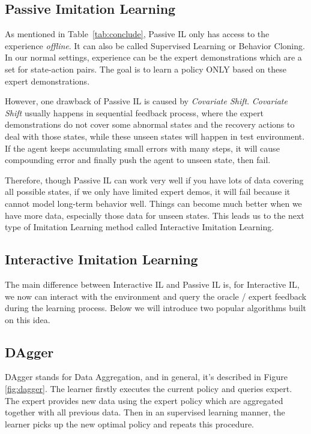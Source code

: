 \documentclass[11pt]{article}
\begin{document}
\subsection{Passive Imitation Learning}
As mentioned in Table~\ref{tab:conclude}, Passive IL only has access to the experience \textit{offline}. It can also be called Supervised Learning or Behavior Cloning. In our normal settings, experience can be the expert demonstrations which are a set for state-action pairs. The goal is to learn a policy ONLY based on these expert demonstrations.

However, one drawback of Passive IL is caused by \textit{Covariate Shift}. \textit{Covariate Shift} usually happens in sequential feedback process, where the expert demonstrations do not cover some abnormal states and the recovery actions to deal with those states, while these unseen states will happen in test environment. If the agent keeps accumulating small errors with many steps, it will cause compounding error and finally push the agent to unseen state, then fail.

Therefore, though Passive IL can work very well if you have lots of data covering all possible states, if we only have limited expert demos, it will fail because it cannot model long-term behavior well. Things can become much better when we have more data, especially those data for unseen states. This leads us to the next type of Imitation Learning method called Interactive Imitation Learning.

\subsection{Interactive Imitation Learning}

The main difference between Interactive IL and Passive IL is, for Interactive IL, we now can interact with the environment and query the oracle / expert feedback during the learning process. Below we will introduce two popular algorithms built on this idea. 

\subsection{DAgger}
DAgger\cite{ross2011reduction} stands for Data Aggregation, and in general, it's described in Figure \ref{fig:dagger}. The learner firstly executes the current policy and queries expert. The expert provides new data using the expert policy which are aggregated together with all previous data. Then in an supervised learning manner, the learner picks up the new optimal policy and repeats this procedure.
\end{document}

